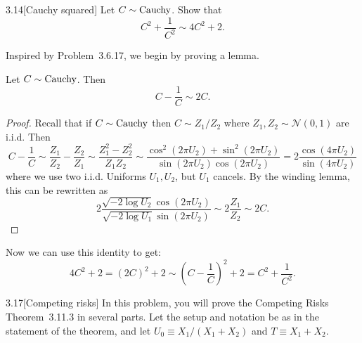 \documentclass{pset}
\begin{document}
\begin{problem}{3.14}[Cauchy squared]
  Let $C\sim \textrm{Cauchy}$. Show that
  \[ C^2 + \frac{1}{C^2} \sim 4C^2 + 2.\]
\end{problem}

\begin{solution}
  Inspired by Problem~3.6.17, we begin by proving a lemma.
  \begin{claim}
    Let $C\sim \textrm{Cauchy}$. Then
    \[
      C - \frac{1}{C} \sim 2C.
    \]
  \end{claim}
  \begin{proof}
    Recall that if $C\sim \textrm{Cauchy}$ then $C\sim Z_1 / Z_2$ where $Z_1, Z_2\sim \mathcal{N}(0,1)$ are i.i.d. Then
    \[
      C-\frac{1}{C} \sim \frac{Z_1}{Z_2} - \frac{Z_2}{Z_1} \sim \frac{Z_1^2 - Z_2^2}{Z_1 Z_2} \sim \frac{\cos^2(2\pi U_2) + \sin^2(2\pi U_2)}{\sin(2\pi U_2) \cos(2\pi U_2)} =2\frac{\cos(4\pi U_2)}{\sin(4\pi U_2)}
    \]
    where we use two i.i.d. Uniforms $U_1, U_2$, but $U_1$ cancels. By the winding lemma, this can be rewritten as
    \[
      2\frac{\sqrt{-2\log U_2} \cos(2\pi U_2)}{\sqrt{-2\log U_1} \sin(2\pi U_2)} \sim 2\frac{Z_1}{Z_2} \sim 2C.
    \]
  \end{proof}

  Now we can use this identity to get:
  \[
    4C^2 + 2 = (2C)^2 + 2 \sim \left(C-\frac{1}{C}\right)^2 + 2 = C^2 + \frac{1}{C^2}.
  \]
\end{solution}

\begin{problem}{3.17}[Competing risks]
  In this problem, you will prove the Competing Risks Theorem~3.11.3 in several parts. Let the setup and notation be as in the statement of the theorem, and let $U_0 \equiv X_1/(X_1 + X_2)$ and $T\equiv X_1+X_2$.
\end{problem}
\end{document}
